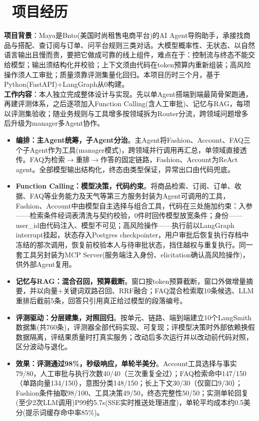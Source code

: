 \documentclass{resume}
\begin{document}
\section{\faInfo\ 项目经历}
\begin{onehalfspacing}
\textbf{项目背景}：Maya是Bnto(美国时尚租售电商平台)的AI Agent导购助手，承接找商品与搭配、查订阅与订单、问平台规则三类对话。大模型概率性、无状态、以自然语言输出且慢而贵，要把它做成可靠的线上组件，难点在于：控制流与终态不能交给模型；输出须结构化并校验；上下文须由代码在token预算内重新组装；高风险操作须人工审批；质量须靠评测集量化回归。本项目历时三个月，基于Python(FastAPI)+LangGraph从0构建。\\

\textbf{工作内容}：本人独立完成整体设计与实现。先以单Agent搭端到端最简骨架跑通，再建评测体系，之后逐项加入Function Calling(含人工审批)、记忆与RAG，每项以评测集验收；随业务规则与工具增多按领域拆为Router分流，跨领域问题增多后升级为manager多Agent协作。\\

\begin{itemize}
    \item \textbf{编排：主Agent统筹，子Agent分治}。主Agent将Fashion、Account、FAQ三个子Agent作为工具(manager模式)，跨领域并行调用再汇总，单领域直接透传。FAQ为检索$\rightarrow$重排$\rightarrow$作答的固定链路，Fashion、Account为ReAct agent。全部模型输出结构化，终态由类型保证，异常出口由代码兜底。
    \item \textbf{Function Calling：模型决策，代码约束}。将商品检索、订阅、订单、收据、FAQ等业务能力及天气等第三方服务封装为Agent可调用的工具，Fashion、Account中由模型自主选择与组合工具，代码在三处施加约束：入参——检索条件经词表清洗与契约校验，0件时回传模型放宽条件；身份——user\_id由代码注入、模型不可见；高风险操作——执行前以LangGraph interrupt挂起，状态存入Postgres checkpointer，用户审批后恢复执行存档中冻结的那次调用，恢复前校验本人与待审批状态，挡住越权与重复执行。同一套工具另封装为MCP Server(服务端注入身份、elicitation确认高风险操作)，供外部Agent复用。
    \item \textbf{记忆与RAG：混合召回，预算截断}。窗口按token预算截断，窗口外做增量摘要，并以向量+关键词双路召回、RRF融合；FAQ混合检索取10条候选、LLM重排后截前5条，回答只引用真正给过模型的段落编号。
    \item \textbf{评测驱动：分层建集，对照回归}。按单元、链路、端到端建立10个LangSmith数据集(共760条)，评测器全部代码实现、可复现；评模型决策时外部依赖换假数据隔离，评结果质量时打真实服务；改动后多次运行并以改动前代码对照，区分波动与退化。
    \item \textbf{效果：评测通过98\%，秒级响应，单轮半美分}。Account工具选择与事实79/80，人工审批与执行次数40/40（三次重复全过）；FAQ检索命中147/150（单路向量134/150），意图分类148/150；长上下文30/30（仅窗口9/30）；Fashion条件抽取98/100、工具决策49/50，终态完整性50/50；实测单轮回复(至少2次LLM调用)P99约5.7s(SSE实时推送处理进度)，单轮平均成本约0.5美分(提示词缓存命中率85\%)。
\end{itemize}
\end{onehalfspacing}
\end{document}
